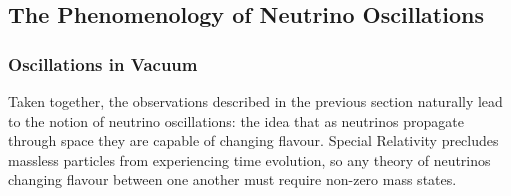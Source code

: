 \subsection{The Phenomenology of Neutrino Oscillations}\label{sec:nu_osc_phenom}
\subsubsection{Oscillations in Vacuum}\label{sec:nu_osc_phenom_vacuum}
Taken together, the observations described in the previous section naturally lead to the notion of neutrino oscillations: the idea that as neutrinos propagate through space they are capable of changing flavour. Special Relativity precludes massless particles from experiencing time evolution, so any theory of neutrinos changing flavour between one another must require non-zero mass states.


